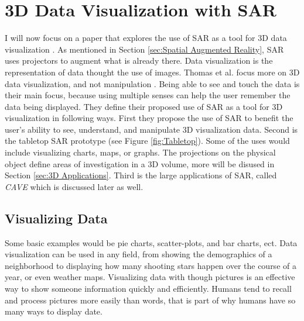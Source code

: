\documentclass{sig-alternate}
\begin{document}
\section{3D Data Visualization with SAR}
\label{sec:3D Data Visualization}
I will now focus on a paper that explores the use of SAR as a tool for 3D data visualization \cite{3D}. As mentioned in Section \ref{sec:Spatial Augmented Reality}, SAR uses projectors to augment what is already there. Data visualization is the representation of data thought the use of images. Thomas et al. focus more on 3D data visualization, and not manipulation \cite{3D}. Being able to see and touch the data is their main focus, because using multiple senses can help the user remember the data being displayed. They define their proposed use of SAR as a tool for 3D visualization in following ways. First they propose the use of SAR to benefit the user's ability to see, understand, and manipulate 3D visualization data. Second is the tabletop SAR prototype (see Figure \ref{fig:Tabletop}). Some of the uses would include visualizing charts, maps, or graphs. The projections on the physical object define areas of investigation in a 3D volume, more will be disused in Section \ref{sec:3D Applications}. Third is the large applications of SAR, called \textit{CAVE} which is discussed later as well.

\subsection{Visualizing Data}
\label{sec:Visualizing Data}
Some basic examples would be pie charts, scatter-plots, and bar charts, ect. Data visualization can be used in any field, from showing the demographics of a neighborhood to displaying how many shooting stars happen over the course of a year, or even weather maps. Visualizing data with though pictures is an effective way to show someone information quickly and efficiently. Humans tend to recall and process pictures more easily than words, that is part of why humans have so many ways to display date.   
\end{document}

